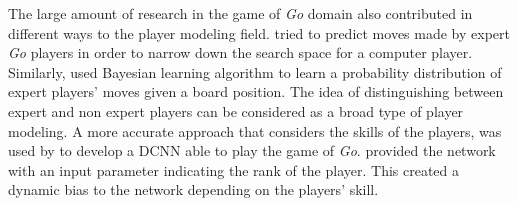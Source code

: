The large amount of research in the game of \textit{Go} domain also contributed in different ways to the player modeling field. \textcite{sutskever_mimicking_2008} tried to predict moves made by expert \textit{Go} players in order to narrow down the search space for a computer player. Similarly, \textcite{stern_bayesian_2006} used Bayesian learning algorithm to learn a probability distribution of expert players' moves given a board position.
The idea of distinguishing between expert and non expert players can be considered as a broad type of player modeling. A more accurate approach that considers the skills of the players, was used by  \textcite{maddison_move_2014} to develop a \acf{DCNN} able to play the game of \textit{Go}. \citeauthor{maddison_move_2014} provided the network with an input parameter indicating the rank of the player. This created a dynamic bias to the network depending on the players' skill. 

